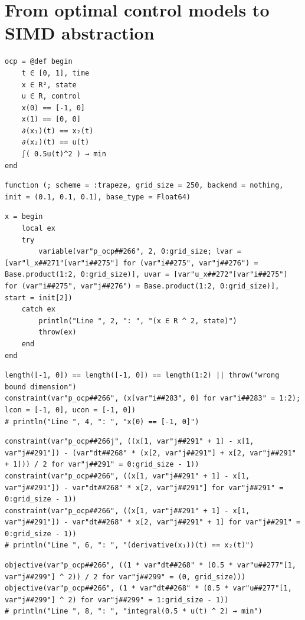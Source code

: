 \section{From optimal control models to SIMD abstraction}

\begin{verbatim}
ocp = @def begin
    t ∈ [0, 1], time
    x ∈ R², state
    u ∈ R, control
    x(0) == [-1, 0]
    x(1) == [0, 0]
    ∂(x₁)(t) == x₂(t)
    ∂(x₂)(t) == u(t)
    ∫( 0.5u(t)^2 ) → min
end
\end{verbatim}

{\small
\begin{verbatim}
function (; scheme = :trapeze, grid_size = 250, backend = nothing, init = (0.1, 0.1, 0.1), base_type = Float64)
\end{verbatim}
}

{\small
\begin{verbatim}
x = begin
    local ex
    try
        variable(var"p_ocp##266", 2, 0:grid_size; lvar = [var"l_x##271"[var"i##275"] for (var"i##275", var"j##276") = Base.product(1:2, 0:grid_size)], uvar = [var"u_x##272"[var"i##275"] for (var"i##275", var"j##276") = Base.product(1:2, 0:grid_size)], start = init[2])
    catch ex
        println("Line ", 2, ": ", "(x ∈ R ^ 2, state)")
        throw(ex)
    end
end
\end{verbatim}
}

{\small
\begin{verbatim}
length([-1, 0]) == length([-1, 0]) == length(1:2) || throw("wrong bound dimension")
constraint(var"p_ocp##266", (x[var"i##283", 0] for var"i##283" = 1:2); lcon = [-1, 0], ucon = [-1, 0])
# println("Line ", 4, ": ", "x(0) == [-1, 0]")
\end{verbatim}
}

{\small
\begin{verbatim} 
constraint(var"p_ocp##266j", ((x[1, var"j##291" + 1] - x[1, var"j##291"]) - (var"dt##268" * (x[2, var"j##291"] + x[2, var"j##291" + 1])) / 2 for var"j##291" = 0:grid_size - 1))
constraint(var"p_ocp##266", ((x[1, var"j##291" + 1] - x[1, var"j##291"]) - var"dt##268" * x[2, var"j##291"] for var"j##291" = 0:grid_size - 1))
constraint(var"p_ocp##266", ((x[1, var"j##291" + 1] - x[1, var"j##291"]) - var"dt##268" * x[2, var"j##291" + 1] for var"j##291" = 0:grid_size - 1))
# println("Line ", 6, ": ", "(derivative(x₁))(t) == x₂(t)")
\end{verbatim}
}

{\small
\begin{verbatim}
objective(var"p_ocp##266", ((1 * var"dt##268" * (0.5 * var"u##277"[1, var"j##299"] ^ 2)) / 2 for var"j##299" = (0, grid_size)))
objective(var"p_ocp##266", (1 * var"dt##268" * (0.5 * var"u##277"[1, var"j##299"] ^ 2) for var"j##299" = 1:grid_size - 1))
# println("Line ", 8, ": ", "integral(0.5 * u(t) ^ 2) → min")
\end{verbatim}
}
           
